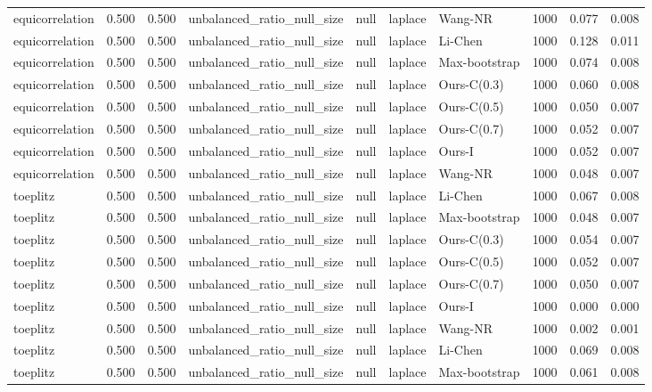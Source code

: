 \begin{tabular}{lrrllllrrr}
equicorrelation & 0.500 & 0.500 & unbalanced\_ratio\_null\_size & null & laplace & Wang-NR & 1000 & 0.077 & 0.008 \\
equicorrelation & 0.500 & 0.500 & unbalanced\_ratio\_null\_size & null & laplace & Li-Chen & 1000 & 0.128 & 0.011 \\
equicorrelation & 0.500 & 0.500 & unbalanced\_ratio\_null\_size & null & laplace & Max-bootstrap & 1000 & 0.074 & 0.008 \\
equicorrelation & 0.500 & 0.500 & unbalanced\_ratio\_null\_size & null & laplace & Ours-C(0.3) & 1000 & 0.060 & 0.008 \\
equicorrelation & 0.500 & 0.500 & unbalanced\_ratio\_null\_size & null & laplace & Ours-C(0.5) & 1000 & 0.050 & 0.007 \\
equicorrelation & 0.500 & 0.500 & unbalanced\_ratio\_null\_size & null & laplace & Ours-C(0.7) & 1000 & 0.052 & 0.007 \\
equicorrelation & 0.500 & 0.500 & unbalanced\_ratio\_null\_size & null & laplace & Ours-I & 1000 & 0.052 & 0.007 \\
equicorrelation & 0.500 & 0.500 & unbalanced\_ratio\_null\_size & null & laplace & Wang-NR & 1000 & 0.048 & 0.007 \\
toeplitz & 0.500 & 0.500 & unbalanced\_ratio\_null\_size & null & laplace & Li-Chen & 1000 & 0.067 & 0.008 \\
toeplitz & 0.500 & 0.500 & unbalanced\_ratio\_null\_size & null & laplace & Max-bootstrap & 1000 & 0.048 & 0.007 \\
toeplitz & 0.500 & 0.500 & unbalanced\_ratio\_null\_size & null & laplace & Ours-C(0.3) & 1000 & 0.054 & 0.007 \\
toeplitz & 0.500 & 0.500 & unbalanced\_ratio\_null\_size & null & laplace & Ours-C(0.5) & 1000 & 0.052 & 0.007 \\
toeplitz & 0.500 & 0.500 & unbalanced\_ratio\_null\_size & null & laplace & Ours-C(0.7) & 1000 & 0.050 & 0.007 \\
toeplitz & 0.500 & 0.500 & unbalanced\_ratio\_null\_size & null & laplace & Ours-I & 1000 & 0.000 & 0.000 \\
toeplitz & 0.500 & 0.500 & unbalanced\_ratio\_null\_size & null & laplace & Wang-NR & 1000 & 0.002 & 0.001 \\
toeplitz & 0.500 & 0.500 & unbalanced\_ratio\_null\_size & null & laplace & Li-Chen & 1000 & 0.069 & 0.008 \\
toeplitz & 0.500 & 0.500 & unbalanced\_ratio\_null\_size & null & laplace & Max-bootstrap & 1000 & 0.061 & 0.008 \\

\end{tabular}
